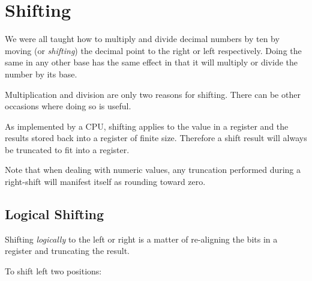 \begin{figure}[ht]
\centering
{}
\label{Figure:ZeroExtend}
\end{figure}


\section{Shifting}

We were all taught how to multiply and divide decimal numbers by ten
by moving (or {\em shifting}) the decimal point to the right or left 
respectively.  Doing the same in any other base has the same effect 
in that it will multiply or divide the number by its base.

%
Multiplication and division are only two reasons for shifting.  There
can be other occasions where doing so is useful.

As implemented by a CPU, shifting applies to the value in a register
and the results stored back into a register of finite size.  Therefore
a shift result will always be truncated to fit into a register.

%
Note that when dealing with numeric values, any truncation performed 
during a right-shift will manifest itself as rounding toward zero.

\subsection{Logical Shifting}

Shifting {\em logically} to the left or right is a matter of re-aligning
the bits in a register and truncating the result.

%
To shift left two positions:

\\

